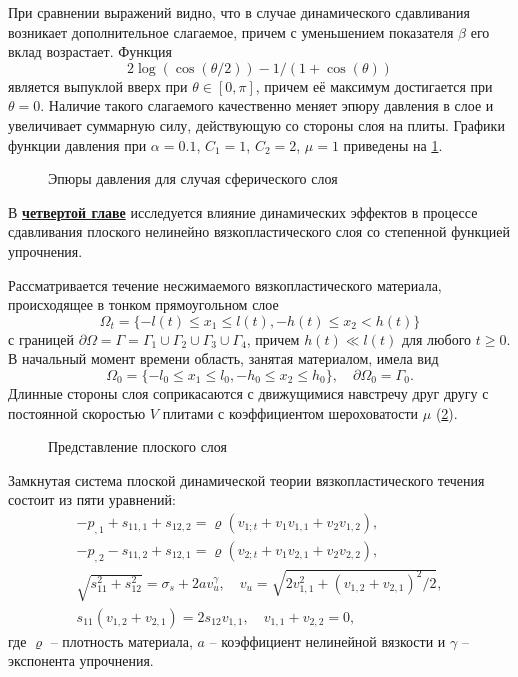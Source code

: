 При сравнении выражений видно, что в случае динамического сдавливания возникает дополнительное слагаемое, причем с уменьшением показателя $\beta$ его вклад возрастает. Функция
\begin{equation*}
  2\log{\left(\cos{\left({\theta / 2}\right)}\right)} - 1/\left(1+\cos{\left(\theta\right)}\right)
\end{equation*}
является выпуклой вверх при $\theta \in [0, \pi]$, причем её максимум достигается при $\theta=0$.
Наличие такого слагаемого качественно меняет эпюру давления в слое и увеличивает суммарную силу, действующую со стороны слоя на плиты.
Графики функции давления при $\alpha=0.1$, $C_1=1$, $C_2=2$, $\mu=1$ приведены на \cref{fig:ch3/sec3/pressure}.
\begin{figure}[ht]
  \caption{Эпюры давления для случая сферического слоя}
  \label{fig:ch3/sec3/pressure}
\end{figure}

В \underline{\textbf{четвертой главе}} исследуется влияние динамических эффектов в процессе сдавливания плоского нелинейно вязкопластического слоя со степенной функцией упрочнения.

Рассматривается течение несжимаемого вязкопластического материала, происходящее в тонком прямоугольном слое
\begin{equation}
  \Omega_{t} = \{-l(t) \le x_{1} \le l(t), -h(t) \le x_{2} < h(t)\}
\end{equation}
с границей $\partial\Omega = \Gamma = \Gamma_{1} \cup \Gamma_{2} \cup \Gamma_{3} \cup \Gamma_{4}$, причем $h(t) \ll l(t)$ для любого $t \ge 0$.
В начальный момент времени область, занятая материалом, имела вид
\begin{equation}
  \Omega_{0} = \{-l_{0} \le x_{1} \le l_{0}, -h_{0} \le x_{2} \le h_{0}\}, \quad \partial\Omega_{0} = \Gamma_{0}.
\end{equation}
Длинные стороны слоя соприкасаются с движущимися навстречу друг другу с постоянной скоростью $V$ плитами с коэффициентом шероховатости $\mu$ (\cref{fig:ch4/layer}).
\begin{figure}[ht]
  \caption{Представление плоского слоя}
  \label{fig:ch4/layer}
\end{figure}

Замкнутая система плоской динамической теории вязкопластического течения состоит из пяти уравнений:
\begin{gather}
  -p_{,1}+s_{11,1}+s_{12,2} = \varrho \left(v_{1;t}+v_{1} v_{1,1} + v_{2} v_{1,2} \right),
  \\
  -p_{,2}-s_{11,2}+s_{12,1} = \varrho \left(v_{2;t}+v_{1} v_{2,1} + v_{2} v_{2,2} \right),
  \\
  \sqrt{s^2_{11}+s^2_{12}}=\sigma_{s} + 2 a v_{u}^\gamma, \quad v_{u} = \sqrt{2 v^2_{1,1}+\left(v_{1,2}+v_{2,1}\right)^2 / 2},
  \\
  s_{11} \left(v_{1,2}+v_{2,1}\right) = 2 s_{12} v_{1,1},\quad v_{1,1}+v_{2,2} = 0,
\end{gather}
где $\varrho$ -- плотность материала, $a$ -- коэффициент нелинейной вязкости и $\gamma$ -- экспонента упрочнения.

